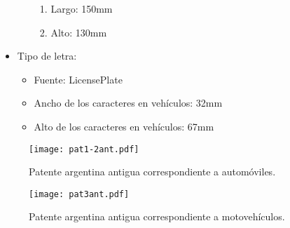 \begin{itemize}
\begin{itemize}
		\begin{enumerate}
			\item Largo: 150mm 
			\item Alto: 130mm 
		\end{enumerate}
	\end{itemize}
	\item Tipo de letra: 
	\begin{itemize}
		\item Fuente: LicensePlate 
		\item Ancho de los caracteres en vehículos: 32mm 
		\item Alto de los caracteres en vehículos: 67mm 
	\end{itemize}
\end{itemize}
\begin{figure}[H]
	\centering
	\texttt{[image: pat1-2ant.pdf]}
	\caption{Patente argentina antigua correspondiente a automóviles.}
	\label{fig:img_pat1-2ant}
\end{figure}
\begin{figure}[H]
	\centering
	\texttt{[image: pat3ant.pdf]}
	\caption{Patente argentina antigua correspondiente a motovehículos.}
	\label{fig:img_pat3ant}
\end{figure}

